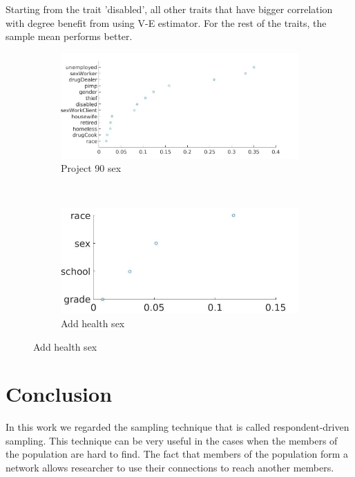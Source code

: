 \documentclass[12pt]{report}
\begin{document}
Starting from the trait 'disabled', all other traits that have bigger correlation with degree benefit from using V-E estimator. For the rest of the traits, the sample mean performs better. 



\begin{figure}[h]
\centering
    \begin{subfigure}[b]{0.6\textwidth}
        \includegraphics[width=\textwidth]{corrDegreePr90}
        \caption{ Project 90 sex}

    \end{subfigure}
    ~
    \begin{subfigure}[b]{0.3\textwidth}
        \includegraphics[width=\textwidth]{corrDegreeStud}
        \caption{ Add health sex }

    \end{subfigure}
\label{fig:degree-val}
\end{figure} 

\chapter*{Conclusion}


In this work we regarded the sampling technique that is called respondent-driven sampling. This technique can  be very useful in the cases when the members of the population are hard to find. The fact that members of the population form a network allows researcher to use their connections to reach another members.
\end{document}
